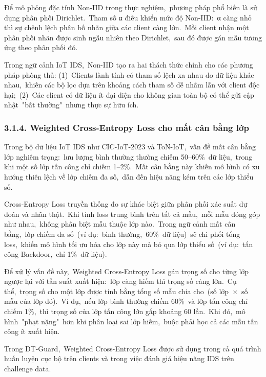 Để mô phỏng đặc tính Non-IID trong thực nghiệm,~phương pháp phổ biến là sử dụng phân phối Dirichlet.~Tham số α điều khiển mức độ Non-IID:~α càng nhỏ thì sự chênh lệch phân bố nhãn giữa các client càng lớn.~Mỗi client nhận một phân phối nhãn được sinh ngẫu nhiên theo Dirichlet,~sau đó được gán mẫu tương ứng theo phân phối đó.

Trong ngữ cảnh IoT IDS,~Non-IID tạo ra hai thách thức chính cho các phương pháp phòng thủ: (1)~Clients lành tính có tham số lệch xa nhau do dữ liệu khác nhau,~khiến các bộ lọc dựa trên khoảng cách tham số dễ nhầm lẫn với client độc hại;~(2)~Các client có dữ liệu ít đại diện cho không gian toàn bộ có thể gửi cập nhật~"bất thường"~nhưng thực sự hữu ích.

\subsubsection{3.1.4. Weighted Cross-Entropy Loss cho mất cân bằng lớp}\label{weighted-cross-entropy-loss-cho-mux1ea5t-cuxe2n-bux1eb1ng-lux1edbp}

Trong bộ dữ liệu IoT IDS như CIC-IoT-2023 và ToN-IoT,~vấn đề mất cân bằng lớp nghiêm trọng:~lưu lượng bình thường thường chiếm 50--60\%~dữ liệu,~trong khi một số lớp tấn công chỉ chiếm 1--2\%.~Mất cân bằng này khiến mô hình có xu hướng thiên lệch về lớp chiếm đa số,~dẫn đến hiệu năng kém trên các lớp thiểu số.

Cross-Entropy Loss truyền thống đo sự khác biệt giữa phân phối xác suất dự đoán và nhãn thật.~Khi tính loss trung bình trên tất cả mẫu,~mỗi mẫu đóng góp như nhau,~không phân biệt mẫu thuộc lớp nào.~Trong ngữ cảnh mất cân bằng,~lớp chiếm đa số~(ví dụ:~bình thường,~60\%~dữ liệu)~sẽ chi phối tổng loss,~khiến mô hình tối ưu hóa cho lớp này mà bỏ qua lớp thiểu số~(ví dụ:~tấn công Backdoor,~chỉ 1\%~dữ liệu).

Để xử lý vấn đề này,~Weighted Cross-Entropy Loss gán trọng số cho từng lớp ngược lại với tần suất xuất hiện:~lớp càng hiếm thì trọng số càng lớn.~Cụ thể,~trọng số cho một lớp được tính bằng tổng số mẫu chia cho~(số lớp~×~số mẫu của lớp đó).~Ví dụ,~nếu lớp bình thường chiếm 60\%~và lớp tấn công chỉ chiếm 1\%,~thì trọng số của lớp tấn công lớn gấp khoảng 60 lần.~Khi đó,~mô hình~"phạt nặng"~hơn khi phân loại sai lớp hiếm,~buộc phải học cả các mẫu tấn công ít xuất hiện.

Trong DT-Guard,~Weighted Cross-Entropy Loss được sử dụng trong cả quá trình huấn luyện cục bộ trên clients và trong việc đánh giá hiệu năng IDS trên challenge data.

